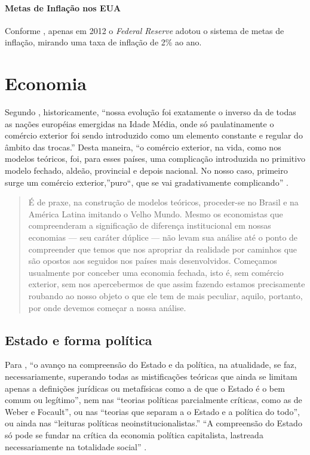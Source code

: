 \documentclass[]{article}
\let\oldparagraph\paragraph
\renewcommand{\paragraph}[1]{\oldparagraph{#1}\mbox{}}
\begin{document}
\paragraph{Metas de Inflação nos EUA}\label{subsubsec:IT_FED}

Conforme , apenas em 2012 o \emph{Federal Reserve}
adotou o sistema de metas de inflação, mirando uma taxa de inflação de
2\% ao ano.

\section{Economia}\label{economia}

Segundo , historicamente, ``nossa
evolução foi exatamente o inverso da de todas as nações européias
emergidas na Idade Média, onde só paulatinamente o comércio exterior foi
sendo introduzido como um elemento constante e regular do âmbito das
trocas.'' Desta maneira, ``o comércio exterior, na vida, como nos
modelos teóricos, foi, para esses países, uma complicação introduzida no
primitivo modelo fechado, aldeão, provincial e depois nacional. No nosso
caso, primeiro surge um comércio exterior,''puro``, que se vai
gradativamente complicando'' \cite[p.~208]{rangel1956}.

\begin{quote}
É de praxe, na construção de modelos teóricos, proceder-se no Brasil e
na América Latina imitando o Velho Mundo. Mesmo os economistas que
compreenderam a significação de diferença institucional em nossas
economias --- seu caráter dúplice --- não levam sua análise até o ponto
de compreender que temos que nos apropriar da realidade por caminhos que
são opostos aos seguidos nos países mais desenvolvidos. Começamos
usualmente por conceber uma economia fechada, isto é, sem comércio
exterior, sem nos apercebermos de que assim fazendo estamos precisamente
roubando ao nosso objeto o que ele tem de mais peculiar, aquilo,
portanto, por onde devemos começar a nossa análise.
\end{quote}

\subsection{Estado e forma política}\label{estado-e-forma-politica}

Para , ``o avanço na compreensão do Estado e
da política, na atualidade, se faz, necessariamente, superando todas as
mistificações teóricas que ainda se limitam apenas a definições
jurídicas ou metafísicas como a de que o Estado é o bem comum ou
legítimo'', nem nas ``teorias políticas parcialmente críticas, como as
de Weber e Focault'', ou nas ``teorias que separam a o Estado e a
política do todo'', ou ainda nas ``leituras políticas
neoinstitucionalistas.'' ``A compreensão do Estado só pode se fundar na
crítica da economia política capitalista, lastreada necessariamente na
totalidade social'' \cite[p.14]{mascaro}.
\end{document}
